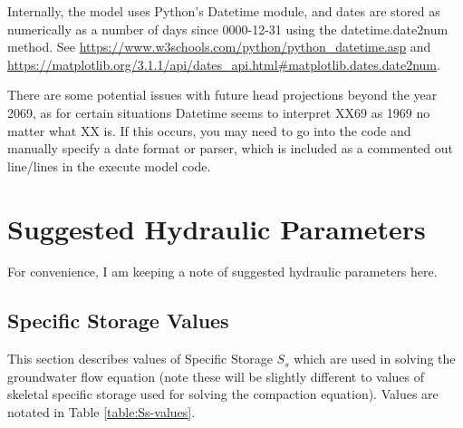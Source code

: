 \documentclass{article}
\begin{document}
Internally, the model uses Python's Datetime module, and dates are stored as numerically as a number of days since 0000-12-31 using the datetime.date2num method. See \url{https://www.w3schools.com/python/python_datetime.asp} and \url{https://matplotlib.org/3.1.1/api/dates_api.html\#matplotlib.dates.date2num}.

There are some potential issues with future head projections beyond the year 2069, as for certain situations Datetime seems to interpret XX69 as 1969 no matter what XX is. If this occurs, you may need to go into the code and manually specify a date format or parser, which is included as a commented out line/lines in the execute model code.

\section{Suggested Hydraulic Parameters}

For convenience, I am keeping a note of suggested hydraulic parameters here. 

\subsection{Specific Storage Values}

This section describes values of Specific Storage $S_s$ which are used in solving the groundwater flow equation (note these will be slightly different to values of skeletal specific storage used for solving the compaction equation). Values are notated in Table \ref{table:Ss-values}.
\end{document}
